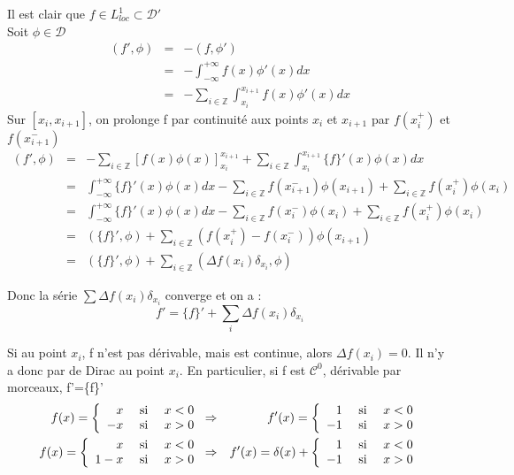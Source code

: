 \documentclass{article}
\begin{document}
\begin{dem}
Il est clair que $f\in L^1_{loc} \subset \mathcal{D}'$ \\
Soit $\phi \in \mathcal{D}$
\begin{eqnarray*}
(f',\phi) &=& -(f,\phi') \\
&=& -\int_{-\infty}^{+\infty} f(x) \phi'(x) dx \\
&=& -\sum_{i\in \mathbb{Z}} \int_{x_i}^{x_{i+1}} f(x) \phi'(x) dx
\end{eqnarray*}
Sur $[x_i,x_{i+1}]$, on prolonge f par continuité aux points $x_i$ et $x_{i+1}$ par $f(x_i^+)$ et $f(x_{i+1}^-)$
\begin{eqnarray*}
(f',\phi)&=& -\sum_{i\in \mathbb{Z}} \left[f(x)\phi(x)\right]_{x_i}^{x_{i+1}} + \sum_{i\in \mathbb{Z}} \int_{x_i}^{x_{i+1}} \{f\}'(x)\phi(x) dx \\
&=& \int_{-\infty}^{+\infty} \{f\}'(x) \phi(x) dx - \sum_{i\in \mathbb{Z}} f(x_{i+1}^-) \phi(x_{i+1}) + \sum_{i\in \mathbb{Z}} f(x_i^+) \phi(x_i) \\
&=& \int_{-\infty}^{+\infty} \{f\}'(x) \phi(x) dx - \sum_{i\in \mathbb{Z}} f(x_i^-) \phi(x_i) + \sum_{i\in \mathbb{Z}} f(x_i^+) \phi(x_i) \\
&=& (\{f\}',\phi) + \sum_{i\in \mathbb{Z}} (f(x_i^+)-f(x_i^-)) \phi(x_{i+1}) \\
&=& (\{f\}',\phi) + \sum_{i\in \mathbb{Z}} (\Delta f(x_i) \delta_{x_i}, \phi)
\end{eqnarray*}

Donc la série $\sum \Delta f(x_i) \delta_{x_i}$ converge et on a : \[f'=\{f\}' + \sum_i \Delta f(x_i)\delta_{x_i}\]
\end{dem}

\begin{rmq}
Si au point $x_i$, f n'est pas dérivable, mais est continue, alors $\Delta f(x_i)=0$. Il n'y a donc par de Dirac au point $x_i$. 
En particulier, si f est $\mathcal{C}^0$, dérivable par morceaux, f'=\{f\}'
\begin{eqnarray*}
f(x)=\left\{ \begin{array}{r l c} x &\text{ si }& x<0 \\ -x &\text{ si }& x>0 \end{array} \right. &\Rightarrow& f'(x)=\left\{ \begin{array}{r c l} 1 &\text{ si }& x<0 \\ -1 &\text{ si }& x>0 \end{array} \right. \\
f(x)=\left\{ \begin{array}{r c l} x &\text{ si }& x<0 \\ 1-x &\text{ si }& x>0 \end{array} \right. &\Rightarrow& f'(x)=\delta(x) + \left\{ \begin{array}{r c l} 1 &\text{ si }& x<0 \\ -1 &\text{ si }& x>0 \end{array} \right.
\end{eqnarray*}
\end{rmq}
\end{document}
